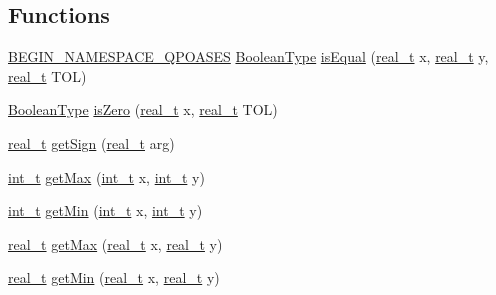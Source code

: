 \subsection*{Functions}
\begin{DoxyCompactItemize}
\item 
\hyperlink{_types_8hpp_afd127fcb3c8f47975e9fa0ec2bacde52}{B\+E\+G\+I\+N\+\_\+\+N\+A\+M\+E\+S\+P\+A\+C\+E\+\_\+\+Q\+P\+O\+A\+S\+ES} \hyperlink{_types_8hpp_a20f82124c82b6f5686a7fce454ef9089}{Boolean\+Type} \hyperlink{_utils_8ipp_a8058471e089d787ed923897c9ca0009f}{is\+Equal} (\hyperlink{qp_o_a_s_e_s__wrapper_8h_a0d00e2b3dfadee81331bbb39068570c4}{real\+\_\+t} x, \hyperlink{qp_o_a_s_e_s__wrapper_8h_a0d00e2b3dfadee81331bbb39068570c4}{real\+\_\+t} y, \hyperlink{qp_o_a_s_e_s__wrapper_8h_a0d00e2b3dfadee81331bbb39068570c4}{real\+\_\+t} T\+OL)
\item 
\hyperlink{_types_8hpp_a20f82124c82b6f5686a7fce454ef9089}{Boolean\+Type} \hyperlink{_utils_8ipp_ac96d2521e1ba560644b11344245d1541}{is\+Zero} (\hyperlink{qp_o_a_s_e_s__wrapper_8h_a0d00e2b3dfadee81331bbb39068570c4}{real\+\_\+t} x, \hyperlink{qp_o_a_s_e_s__wrapper_8h_a0d00e2b3dfadee81331bbb39068570c4}{real\+\_\+t} T\+OL)
\item 
\hyperlink{qp_o_a_s_e_s__wrapper_8h_a0d00e2b3dfadee81331bbb39068570c4}{real\+\_\+t} \hyperlink{_utils_8ipp_a7f9147d98ff31048a09a5e61ecd81d2b}{get\+Sign} (\hyperlink{qp_o_a_s_e_s__wrapper_8h_a0d00e2b3dfadee81331bbb39068570c4}{real\+\_\+t} arg)
\item 
\hyperlink{_types_8hpp_ab6fd6105e64ed14a0c9281326f05e623}{int\+\_\+t} \hyperlink{_utils_8ipp_a831cbfe8455d9b992e5a05a9bae93e6b}{get\+Max} (\hyperlink{_types_8hpp_ab6fd6105e64ed14a0c9281326f05e623}{int\+\_\+t} x, \hyperlink{_types_8hpp_ab6fd6105e64ed14a0c9281326f05e623}{int\+\_\+t} y)
\item 
\hyperlink{_types_8hpp_ab6fd6105e64ed14a0c9281326f05e623}{int\+\_\+t} \hyperlink{_utils_8ipp_a72072d0b9af880ab468c642bee9130a6}{get\+Min} (\hyperlink{_types_8hpp_ab6fd6105e64ed14a0c9281326f05e623}{int\+\_\+t} x, \hyperlink{_types_8hpp_ab6fd6105e64ed14a0c9281326f05e623}{int\+\_\+t} y)
\item 
\hyperlink{qp_o_a_s_e_s__wrapper_8h_a0d00e2b3dfadee81331bbb39068570c4}{real\+\_\+t} \hyperlink{_utils_8ipp_a8fdffff19505aed691eeca46c8c20fe6}{get\+Max} (\hyperlink{qp_o_a_s_e_s__wrapper_8h_a0d00e2b3dfadee81331bbb39068570c4}{real\+\_\+t} x, \hyperlink{qp_o_a_s_e_s__wrapper_8h_a0d00e2b3dfadee81331bbb39068570c4}{real\+\_\+t} y)
\item 
\hyperlink{qp_o_a_s_e_s__wrapper_8h_a0d00e2b3dfadee81331bbb39068570c4}{real\+\_\+t} \hyperlink{_utils_8ipp_aa083f5ed6e68f9cf54621ab4dc072fcf}{get\+Min} (\hyperlink{qp_o_a_s_e_s__wrapper_8h_a0d00e2b3dfadee81331bbb39068570c4}{real\+\_\+t} x, \hyperlink{qp_o_a_s_e_s__wrapper_8h_a0d00e2b3dfadee81331bbb39068570c4}{real\+\_\+t} y)

\end{DoxyCompactItemize}
